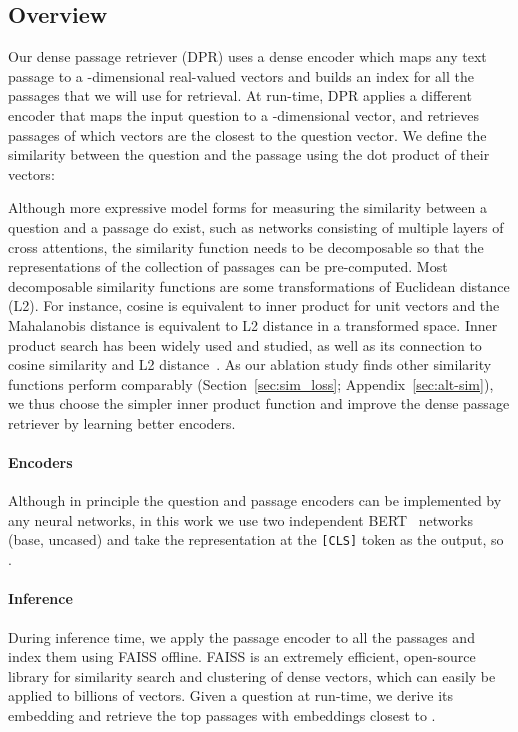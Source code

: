 \documentclass[11pt,a4paper]{article}
\def\model/{DPR}
\newcommand\ttt[1]{\texttt{#1}}
\begin{document}
\subsection{Overview}
Our dense passage retriever (\model/) uses a dense encoder  which maps any text passage to a -dimensional real-valued vectors and builds an index for all the  passages that we will use for retrieval.
At run-time, \model/ applies a different encoder  that maps the input question to a -dimensional vector, and retrieves  passages
of which vectors are the closest to the question vector. We define the similarity between the question and the passage using the dot product of their vectors:

Although more expressive model forms for measuring the similarity between a question and a passage do exist, such as networks consisting of multiple layers of cross attentions, the similarity function needs to be decomposable so that the representations of the collection of passages can be pre-computed.
Most decomposable similarity functions are some transformations of Euclidean distance (L2). For instance, cosine is equivalent to inner product for unit vectors and the Mahalanobis distance is equivalent to L2 distance in a transformed space.
Inner product search has been widely used and studied, as well as its connection to cosine similarity and L2 distance~\cite{mussmann2016learning,ram2012maximum}.
As our ablation study finds other similarity functions perform comparably (Section~\ref{sec:sim_loss}; Appendix~\ref{sec:alt-sim}), we thus choose the simpler inner product function and improve the dense passage retriever by learning better encoders.

\paragraph{Encoders}
Although in principle the question and passage encoders can be implemented by any neural networks, in this work we use two independent BERT~\cite{devlin2018bert} networks (base, uncased) and take the representation at the \ttt{[CLS]} token as the output, so .

\paragraph{Inference}
During inference time, we apply the passage encoder  to all the passages and index them using FAISS \cite{johnson2017billion} offline.
FAISS is an extremely efficient, open-source library for similarity search and clustering of dense vectors, which can easily be applied to billions of vectors.
Given a question  at run-time, we derive its embedding  and retrieve the top  passages with embeddings closest to .
\end{document}
